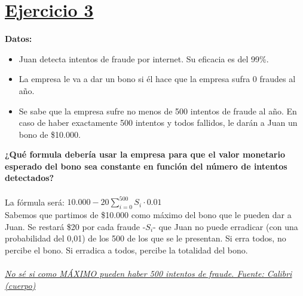 \documentclass{article}
\newcommand{\ulcolor}[2][Red]{\setulcolor{#1}\ul{#2}}
\begin{document}
    \section*{\underline{Ejercicio 3}}
        \textbf{Datos:}
        \begin{itemize}
            \item Juan detecta intentos de fraude por internet. Su eficacia es del 99\%.
            \item La empresa le va a dar un bono si él hace que la empresa sufra 0 fraudes al año.
            \item Se sabe que la empresa sufre no menos de 500 intentos de fraude al año. En caso de haber exactamente 500 intentos y todos fallidos, le darán a Juan un bono de \$10.000.
        \end{itemize}
        \textbf{¿Qué formula debería usar la empresa para que el valor monetario esperado del bono sea constante en función del número de intentos detectados?}
        \\
        \\
        La fórmula será: \(10.000 - 20 \sum_{i = 0}^{500}S_{i} \cdot 0.01\)
        \\
        Sabemos que partimos de \$10.000 como máximo del bono que le pueden dar a Juan. Se restará \$20 por cada fraude -\(S_{i}\)- que Juan no puede erradicar (con una probabilidad del 0,01) de los 500 de los que se le presentan. Si erra todos, no percibe el bono. Si erradica a todos, percibe la totalidad del bono.
        \\
        \\
        \textit{\ulcolor[Red]{No sé si como MÁXIMO pueden haber 500 intentos de fraude. Fuente: Calibri (cuerpo)}}
\end{document}

